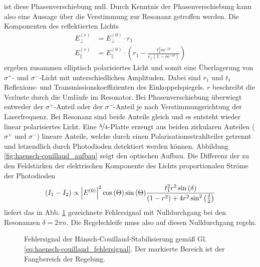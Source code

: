 ist diese Phasenverschiebung null. Durch Kenntnis der Phasenverschiebung kann
also eine Aussage über die Verstimmung zur Resonanz getroffen werden. Die
Komponenten des reflektierten Lichts
\begin{equation}\label{eq:haensch-couillaud_02}
	\begin{split}
		E_{\perp}^{(r)} & = E_{\perp}^{(0)}\cdot r_1\\
		E_{\parallel}^{(r)} & = E_{\parallel}^{(0)}\cdot\left(r_1-\frac{t_1^2r\mathrm{e}^{-\mathrm{i}\delta}}{r_1\left(1-r\mathrm{e}^{-\mathrm{i}\delta}\right)}\right)
	\end{split}
\end{equation}
ergeben zusammen elliptisch polarisiertes Licht und somit eine Überlagerung von
$\sigma^+$- und $\sigma^-$-Licht mit unterschiedlichen Amplituden. Dabei sind
$r_1$ und $t_1$ Reflexions- und Transmissionskoeffizienten des
Einkoppelspiegels. $r$ beschreibt die Verluste durch die Umläufe im Resonator.
Bei Phasenverschiebung überwiegt entweder der $\sigma^+$-Anteil oder der
$\sigma^-$-Anteil je nach Verstimmungsrichtung der Laserfrequenz.
Bei Resonanz sind beide Anteile gleich und es entsteht wieder linear polarisiertes Licht. Eine $\nicefrac{\lambda}{4}$-Platte erzeugt aus beiden zirkularen Anteilen ($\sigma^+$ und $\sigma^-$) lineare Anteile, welche durch einen Polarisationsstrahlteiler getrennt und letzendlich durch Photodioden
detektiert werden können. Abbildung \ref{fig:haensch-couillaud_aufbau} zeigt den
optischen Aufbau. Die Differenz der zu den Feldstärken der elektrischen Komponente
des Lichts proportionalen Ströme der Photodioden
\begin{equation}\label{eq:haensch-couillaud_fehlersignal}
	(I_1-I_2)\propto\left|E^{(0)}\right|^2\cos{(\Theta)}\sin{(\Theta)}\frac{t_1^2r^2\sin{(\delta)}}{(1-r^2)+4r^2\sin^2{\left(\frac{\delta}{2}\right)}}
\end{equation}
liefert das in Abb. \ref{fig:haensch-couillaud_fehlersignal} gezeichnete
Fehlersignal mit Nulldurchgang bei den Resonanzen $\delta=2\pi n$. Die
Regelschleife muss also auf diesen Nulldurchgang regeln.
\begin{figure}[h]
	\centering
	\footnotesize
	
	\caption[Hänsch-Couillaud - Fehlersignal]{Fehlersignal der
	Hänsch-Couillaud-Stabilisierung
	gemäß Gl.
	\eqref{eq:haensch-couillaud_fehlersignal}.
	Der markierte Bereich ist der
	Fangbereich der Regelung.}\label{fig:haensch-couillaud_fehlersignal}
\end{figure}

